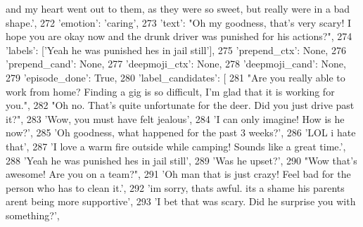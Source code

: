 \begin{DoxyCode}
{       and my heart went out to them, as they were so sweet, but really were in a bad shape.'},
272                         \textcolor{stringliteral}{'emotion'}: \textcolor{stringliteral}{'caring'},
273                         \textcolor{stringliteral}{'text'}: \textcolor{stringliteral}{"Oh my goodness, that's very scary! I hope you are okay now and the drunk
       driver was punished for his actions?"},
274                         \textcolor{stringliteral}{'labels'}: [\textcolor{stringliteral}{'Yeah he was punished hes in jail still'}],
275                         \textcolor{stringliteral}{'prepend\_ctx'}: \textcolor{keywordtype}{None},
276                         \textcolor{stringliteral}{'prepend\_cand'}: \textcolor{keywordtype}{None},
277                         \textcolor{stringliteral}{'deepmoji\_ctx'}: \textcolor{keywordtype}{None},
278                         \textcolor{stringliteral}{'deepmoji\_cand'}: \textcolor{keywordtype}{None},
279                         \textcolor{stringliteral}{'episode\_done'}: \textcolor{keyword}{True},
280                         \textcolor{stringliteral}{'label\_candidates'}: [
281                             \textcolor{stringliteral}{"Are you really able to work from home? Finding a gig is so difficult, I'm glad
       that it is working for you."},
282                             \textcolor{stringliteral}{"Oh no. That's quite unfortunate for the deer. Did you just drive past it?"},
283                             \textcolor{stringliteral}{'Wow, you must have felt jealous'},
284                             \textcolor{stringliteral}{'I can only imagine! How is he now?'},
285                             \textcolor{stringliteral}{'Oh goodness, what happened for the past 3 weeks?'},
286                             \textcolor{stringliteral}{'LOL i hate that'},
287                             \textcolor{stringliteral}{'I love a warm fire outside while camping! Sounds like a great time.'},
288                             \textcolor{stringliteral}{'Yeah he was punished hes in jail still'},
289                             \textcolor{stringliteral}{'Was he upset?'},
290                             \textcolor{stringliteral}{"Wow that's awesome! Are you on a team?"},
291                             \textcolor{stringliteral}{'Oh man that is just crazy! Feel bad for the person who has to clean it.'},
292                             \textcolor{stringliteral}{'im sorry, thats awful. its a shame his parents arent being more supportive'},
293                             \textcolor{stringliteral}{'I bet that was scary. Did he surprise you with something?'},

\end{DoxyCode}
